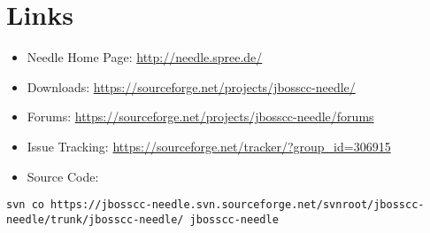 \section{Links}

\begin{itemize}
 \item Needle Home Page:   	\url{http://needle.spree.de/}
	\item Downloads:        \url{https://sourceforge.net/projects/jbosscc-needle/}
	\item Forums:           \url{https://sourceforge.net/projects/jbosscc-needle/forums}
	\item Issue Tracking:   \url{https://sourceforge.net/tracker/?group\_id=306915}
	\item Source Code:
\end{itemize}

\begin{lstlisting}[caption=Source Code]
svn co https://jbosscc-needle.svn.sourceforge.net/svnroot/jbosscc-needle/trunk/jbosscc-needle/ jbosscc-needle
\end{lstlisting}

